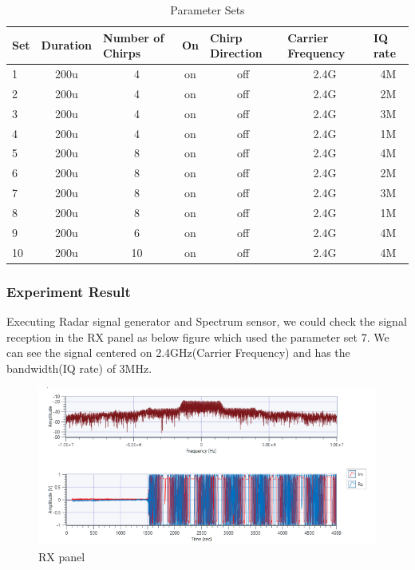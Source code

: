     \begin{table}[!h]\centering
        \hspace{10mm}
        \begin{tabular}{|l|c|c|c|c|c|c|}
        \hline
        \multicolumn{1}{|l|}{Set} & 
        \multicolumn{1}{l|}{Duration} & 
        \multicolumn{1}{l|}{Number of Chirps} & 
        \multicolumn{1}{l|}{On} & 
        \multicolumn{1}{l|}{Chirp Direction} & 
        \multicolumn{1}{l|}{Carrier Frequency} & 
        \multicolumn{1}{l|}{IQ rate} \\
        \hline
        1 & 200u & 4 & on & off & 2.4G & 4M \\ 
        \hline
        2 & 200u & 4 & on & off & 2.4G & 2M \\ 
        \hline
        3 & 200u & 4 & on & off & 2.4G & 3M \\ 
        \hline
        4 & 200u & 4 & on & off & 2.4G & 1M \\ 
        \hline
        5 & 200u & 8 & on & off & 2.4G & 4M \\ 
        \hline
        6 & 200u & 8 & on & off & 2.4G & 2M \\ 
        \hline
        7 & 200u & 8 & on & off & 2.4G & 3M \\ 
        \hline
        8 & 200u & 8 & on & off & 2.4G & 1M \\ 
        \hline
        9 & 200u & 6 & on & off & 2.4G & 4M \\ 
        \hline
        10 & 200u & 10 & on & off & 2.4G & 4M \\ 
        \hline
        \end{tabular}
        \caption{Parameter Sets}
    \end{table}
\clearpage 
    
    \subsubsection*{Experiment Result}
    Executing Radar signal generator and Spectrum sensor, we could check the signal reception in the RX panel as below figure which used the parameter set 7. We can see the signal centered on 2.4GHz(Carrier Frequency) and has the bandwidth(IQ rate) of 3MHz. \\
    \vspace{-4mm}  
    \begin{figure}[!h]\centering 
    \hspace{15mm}
		\includegraphics[width=.99\textwidth]{image/week04/1-1-0.png}
		\caption{\footnotesize RX panel}
		\vspace{-10pt}
    \end{figure}

